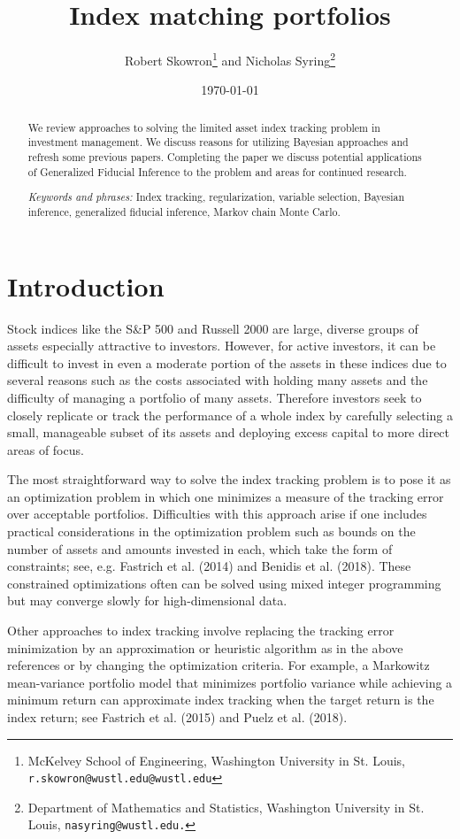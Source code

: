 \documentclass[a4paper, 12pt]{article}
\title{Index matching portfolios}
\author{Robert Skowron\footnote{McKelvey School of Engineering, Washington University in St. Louis, {\tt r.skowron@wustl.edu@wustl.edu}} \quad and \quad Nicholas Syring\footnote{Department of Mathematics and Statistics, Washington University in St. Louis,  {\tt nasyring@wustl.edu.}}}
\date{\today}
\theoremstyle{plain}
\theoremstyle{definition}
\theoremstyle{remark}
\begin{document}
\maketitle



\begin{abstract}
	We review approaches to solving the limited asset index tracking problem in investment management. We discuss reasons for utilizing Bayesian approaches and refresh some previous papers. Completing the paper we discuss potential applications of Generalized Fiducial Inference to the problem and areas for continued research.


\smallskip

\emph{Keywords and phrases:} Index tracking, regularization, variable selection, Bayesian inference, generalized fiducial inference, Markov chain Monte Carlo.

\end{abstract}


\section{Introduction}
\label{S:intro}

Stock indices like the S\&P 500 and Russell 2000 are large, diverse groups of assets especially attractive to investors.  However, for active investors, it can be difficult to invest in even a moderate portion of the assets in these indices due to several reasons such as the costs associated with holding many assets and the difficulty of managing a portfolio of many assets.  Therefore investors seek to closely replicate or track the performance of a whole index by carefully selecting a small, manageable subset of its assets and deploying excess capital to more direct areas of focus.

The most straightforward way to solve the index tracking problem is to pose it as an optimization problem in which one minimizes a measure of the tracking error over acceptable portfolios.  Difficulties with this approach arise if one includes practical considerations in the optimization problem such as bounds on the number of assets and amounts invested in each, which take the form of constraints; see, e.g. Fastrich et al. (2014) and Benidis et al. (2018).  These constrained optimizations often can be solved using mixed integer programming but may converge slowly for high-dimensional data.  

Other approaches to index tracking involve replacing the tracking error minimization by an approximation or heuristic algorithm as in the above references or by changing the optimization criteria.  For example, a Markowitz mean-variance portfolio model that minimizes portfolio variance while achieving a minimum return can approximate index tracking when the target return is the index return; see Fastrich et al. (2015) and Puelz et al. (2018).   
\end{document}
